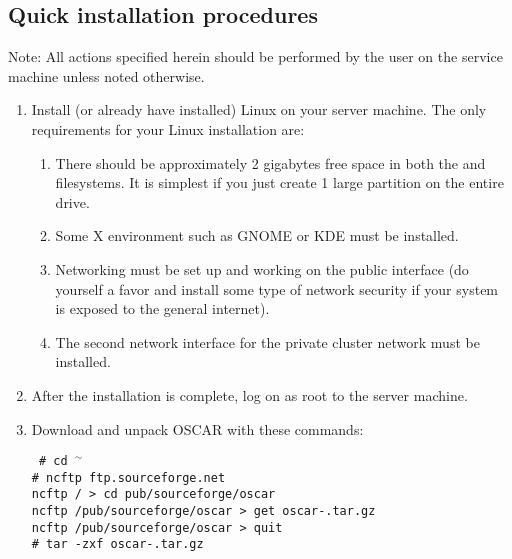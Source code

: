\subsection{Quick installation procedures}

Note: All actions specified herein should be performed by the
 user on the service machine unless noted otherwise.

\begin {enumerate}
\item Install (or already have installed) Linux on your server
  machine.  The only requirements for your Linux installation are:

  \begin{enumerate}
  \item There should be approximately 2 gigabytes free space in both
    the \file{/} and  filesystems. It is simplest if you
    just create 1 large partition on the entire drive.
    
  \item Some X environment such as GNOME or KDE must be installed.
  \item Networking must be set up and working on the public interface
    (do yourself a favor and install some type of network security if
    your system is exposed to the general internet).
  \item The second network interface for the private cluster network
    must be installed.
  \end{enumerate}
  
  
\item After the installation is complete, log on as root to the server
  machine.

\item Download and unpack OSCAR with these commands:

  \vspace{11pt}
  {\tt
    \# cd $^\sim$ \\
    \# ncftp ftp.sourceforge.net \\
    ncftp / > cd pub/sourceforge/oscar \\
    ncftp /pub/sourceforge/oscar > get oscar-\oscarversion.tar.gz \\
    ncftp /pub/sourceforge/oscar > quit \\
    \# tar -zxf oscar-\oscarversion.tar.gz
    }
  \vspace{11pt}


\end{enumerate}
